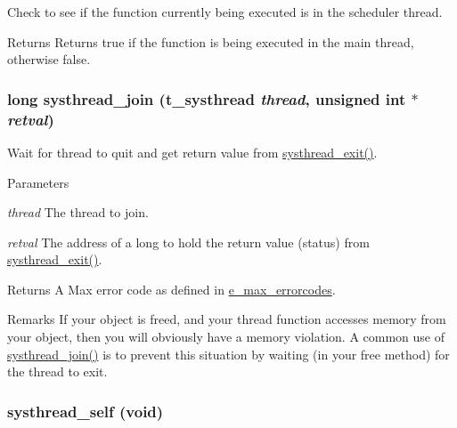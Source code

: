 Check to see if the function currently being executed is in the scheduler thread. \begin{DoxyReturn}{Returns}
Returns true if the function is being executed in the main thread, otherwise false. 
\end{DoxyReturn}
\hypertarget{group__threading_gaac24a9db0d7af2343501a4e762d2ce85}{
\subsubsection[{systhread\_\-join}]{\setlength{\rightskip}{0pt plus 5cm}long systhread\_\-join ({\bf t\_\-systhread} {\em thread}, \/  unsigned int $\ast$ {\em retval})}}
\label{group__threading_gaac24a9db0d7af2343501a4e762d2ce85}


Wait for thread to quit and get return value from \hyperlink{group__threading_gad448ff5be27ef8233162a0e24751786f}{systhread\_\-exit()}. 
\begin{DoxyParams}{Parameters}
\item[{\em thread}]The thread to join. \item[{\em retval}]The address of a long to hold the return value (status) from \hyperlink{group__threading_gad448ff5be27ef8233162a0e24751786f}{systhread\_\-exit()}. \end{DoxyParams}
\begin{DoxyReturn}{Returns}
A Max error code as defined in \hyperlink{group__misc_ga0764dd6c02b76cca7d053ae50555d69d}{e\_\-max\_\-errorcodes}.
\end{DoxyReturn}
\begin{DoxyRemark}{Remarks}
If your object is freed, and your thread function accesses memory from your object, then you will obviously have a memory violation. A common use of \hyperlink{group__threading_gaac24a9db0d7af2343501a4e762d2ce85}{systhread\_\-join()} is to prevent this situation by waiting (in your free method) for the thread to exit. 
\end{DoxyRemark}
\hypertarget{group__threading_gab76eb3e1668b13483533c4929be5c914}{
\subsubsection[{systhread\_\-self}]{ systhread\_\-self (void)}}
\label{group__threading_gab76eb3e1668b13483533c4929be5c914}


